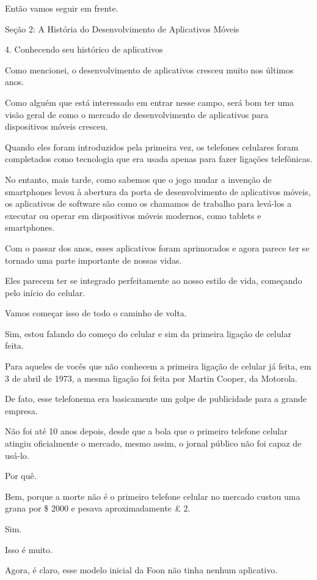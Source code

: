 Então vamos seguir em frente.


Seção 2: A História do Desenvolvimento de Aplicativos Móveis

4. Conhecendo seu histórico de aplicativos

Como mencionei, o desenvolvimento de aplicativos cresceu muito nos últimos anos.

Como alguém que está interessado em entrar nesse campo, será bom ter uma visão geral de como o mercado de desenvolvimento de aplicativos para dispositivos móveis cresceu.

Quando eles foram introduzidos pela primeira vez, os telefones celulares foram completados como tecnologia que era usada apenas para fazer ligações telefônicas.

No entanto, mais tarde, como sabemos que o jogo mudar a invenção de smartphones levou à abertura da porta de desenvolvimento de aplicativos móveis, os aplicativos de software são como os chamamos de trabalho para levá-los a executar ou operar em dispositivos móveis modernos, como tablets e smartphones.

Com o passar dos anos, esses aplicativos foram aprimorados e agora parece ter se tornado uma parte importante de nossas vidas.

Eles parecem ter se integrado perfeitamente ao nosso estilo de vida, começando pelo início do celular.

Vamos começar isso de todo o caminho de volta.

Sim, estou falando do começo do celular e sim da primeira ligação de celular feita.

Para aqueles de vocês que não conhecem a primeira ligação de celular já feita, em 3 de abril de 1973, a mesma ligação foi feita por Martin Cooper, da Motorola.

De fato, esse telefonema era basicamente um golpe de publicidade para a grande empresa.

Não foi até 10 anos depois, desde que a bola que o primeiro telefone celular atingiu oficialmente o mercado, mesmo assim, o jornal público não foi capaz de usá-lo.

Por quê.

Bem, porque a morte não é o primeiro telefone celular no mercado custou uma grana por \$ 2000 e pesava aproximadamente £ 2.

Sim.

Isso é muito.

Agora, é claro, esse modelo inicial da Foon não tinha nenhum aplicativo.

